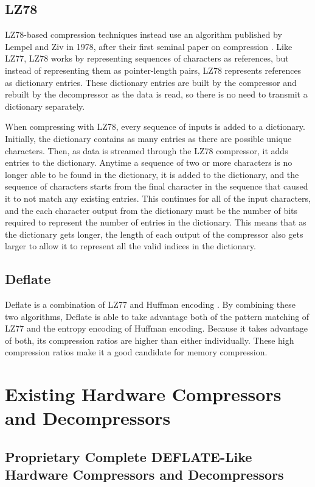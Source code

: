 \documentclass[doublespace,nopageskip]{VTthesis}
\begin{document}
\subsection{LZ78}\label{ss:lz78}
LZ78-based compression techniques instead use an algorithm published by Lempel and Ziv in 1978, after their first seminal paper on compression \cite{lz78}. Like LZ77, LZ78 works by representing sequences of characters as references, but instead of representing them as pointer-length pairs, LZ78 represents references as dictionary entries. These dictionary entries are built by the compressor and rebuilt by the decompressor as the data is read, so there is no need to transmit a dictionary separately.

When compressing with LZ78, every sequence of inputs is added to a dictionary. Initially, the dictionary contains as many entries as there are possible unique characters. Then, as data is streamed through the LZ78 compressor, it adds entries to the dictionary. Anytime a sequence of two or more characters is no longer able to be found in the dictionary, it is added to the dictionary, and the sequence of characters starts from the final character in the sequence that caused it to not match any existing entries. This continues for all of the input characters, and the each character output from the dictionary must be the number of bits required to represent the number of entries in the dictionary. This means that as the dictionary gets longer, the length of each output of the compressor also gets larger to allow it to represent all the valid indices in the dictionary.

\subsection{Deflate}\label{ss:deflate}
Deflate is a combination of LZ77 and Huffman encoding \cite{deflate}. By combining these two algorithms, Deflate is able to take advantage both of the pattern matching of LZ77 and the entropy encoding of Huffman encoding. Because it takes advantage of both, its compression ratios are higher than either individually. These high compression ratios make it a good candidate for memory compression.

\section{Existing Hardware Compressors and Decompressors}\label{se:existing_hardware_compressors_and_decompressors}
\subsection{Proprietary Complete DEFLATE-Like Hardware Compressors and Decompressors}\label{ss:complete_deflate-like_hardware_compressors_and_decompressors}
\end{document}
